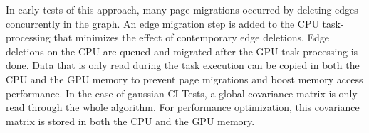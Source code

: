 In early tests of this approach, many page migrations occurred by deleting edges concurrently in the graph. An edge migration step is added to the CPU task-processing that minimizes the effect of contemporary edge deletions. Edge deletions on the CPU are queued and migrated after the GPU task-processing is done.
Data that is only read during the task execution can be copied in both the CPU and the GPU memory to prevent page migrations and boost memory access performance. In the case of gaussian CI-Tests, a global covariance matrix is only read through the whole algorithm. For performance optimization, this covariance matrix is stored in both the CPU and the GPU memory.

